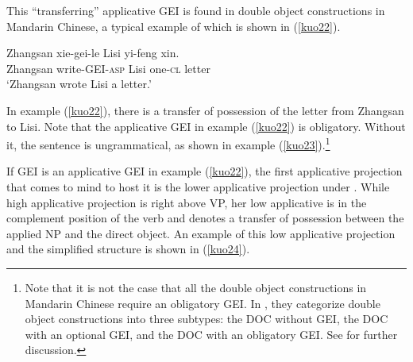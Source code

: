 \documentclass[output=paper,colorlinks,citecolor=brown]{langscibook}
\begin{document}
This ``transferring'' applicative GEI is found in double object constructions in Mandarin Chinese, a typical example of which is shown in (\ref{kuo22}).

\ea
\label{kuo22}
\gll Zhangsan   xie-gei-le              Lisi    yi-feng          xin.\\  
     Zhangsan   write-GEI-\textsc{asp}  Lisi    one-\textsc{cl} letter\\ 
\glt `Zhangsan wrote Lisi a letter.'
\z

In example (\ref{kuo22}), there is a transfer of possession of the letter from Zhangsan to Lisi. Note that the applicative GEI in example (\ref{kuo22}) is obligatory. Without it, the sentence is ungrammatical, as shown in example (\ref{kuo23}).\footnote{Note that it is not the case that all the double object constructions in Mandarin Chinese require an obligatory GEI. In \citet{Li1&Thompson}, they categorize double object constructions into three subtypes: the DOC without GEI, the DOC with an optional GEI, and the DOC with an obligatory GEI. See \citet{Li1&Thompson} for further discussion.}


\z

If GEI is an applicative GEI in example (\ref{kuo22}), the first applicative projection that comes to mind to host it is the lower applicative projection under \citet{Pylkkanen2002,Pylkkanen2008}. While  high applicative projection is right above VP, her low applicative is in the complement position of the verb and denotes a transfer of possession between the applied NP and the direct object. An example of this low applicative projection and the simplified structure is shown in (\ref{kuo24}).

\ea
    \label{kuo24}
    \z
\z
\end{document}

